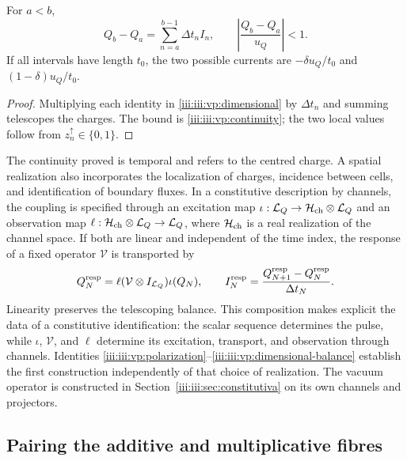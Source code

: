 \begin{proposition}
For $a<b$,
\begin{equation}
 Q_b-Q_a=\sum_{n=a}^{b-1}\Delta t_n I_n,
 \qquad
 \left|\frac{Q_b-Q_a}{u_Q}\right|<1.
 \label{iii:iii:vp:dimensional-balance}
\end{equation}
If all intervals have length $t_0$, the two possible currents
are $-\delta u_Q/t_0$ and $(1-\delta)u_Q/t_0$.
\end{proposition}
\begin{proof}
Multiplying each identity in \eqref{iii:iii:vp:dimensional} by
$\Delta t_n$ and summing telescopes the charges. The bound is
\eqref{iii:iii:vp:continuity}; the two local values follow from
$z_n^{\uparrow}\in\{0,1\}$.
\end{proof}

The continuity proved is temporal and refers to the centred charge.
A spatial realization also incorporates the localization of charges,
incidence between cells, and identification of boundary fluxes.
In a constitutive description by channels, the coupling is specified
through an excitation map
$\iota:\mathcal L_Q\to\mathcal H_{\rm ch}\otimes\mathcal L_Q$
and an observation map
$\ell:\mathcal H_{\rm ch}\otimes\mathcal L_Q\to\mathcal L_Q$,
where $\mathcal H_{\rm ch}$ is a real realization of the channel space.
If both are
linear and independent of the time index, the response of a fixed operator
$\mathcal V$ is transported by
\[
 Q_N^{\rm resp}=\ell(\mathcal V\otimes I_{\mathcal L_Q})\iota(Q_N),
 \qquad
 I_N^{\rm resp}=\frac{Q_{N+1}^{\rm resp}-Q_N^{\rm resp}}{\Delta t_N}.
\]
Linearity preserves the telescoping balance. This composition makes
explicit the data of a constitutive identification: the scalar sequence
determines the pulse, while $\iota$, $\mathcal V$, and $\ell$
determine its excitation, transport, and observation through channels. Identities
\eqref{iii:iii:vp:polarization}--\eqref{iii:iii:vp:dimensional-balance}
establish the first construction independently of that choice of
realization. The vacuum operator is constructed in
Section~\ref{iii:iii:sec:constitutiva} on its own channels and projectors.

\subsection{Pairing the additive and multiplicative fibres}

